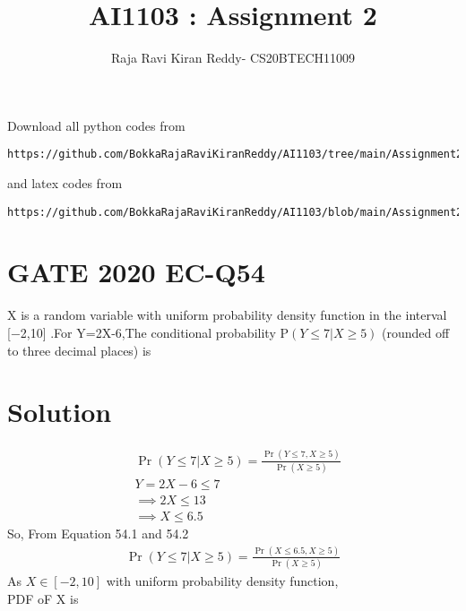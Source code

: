 \documentclass[journal,12pt,twocolumn]{IEEEtran}
\begin{document}
\let\vec\mathbf
\renewcommand{\thefigure}{\theproblem}
\def\putbox#1#2#3{\makebox[0in][l]{\makebox[#1][l]{}\raisebox{\baselineskip}[0in][0in]{\raisebox{#2}[0in][0in]{#3}}}}
     \def\rightbox#1{\makebox[0in][r]{#1}}
     \def\centbox#1{\makebox[0in]{#1}}
     \def\topbox#1{\raisebox{-\baselineskip}[0in][0in]{#1}}
     \def\midbox#1{\raisebox{-0.5\baselineskip}[0in][0in]{#1}}
\vspace{3cm}
\title{AI1103 : Assignment 2}
\author{Raja Ravi Kiran Reddy- CS20BTECH11009}
\maketitle
\newpage
\bigskip
\renewcommand{\thefigure}{\arabic{figure}}
\renewcommand{\thetable}{\arabic{table}}
Download all python codes from 
\begin{lstlisting}
https://github.com/BokkaRajaRaviKiranReddy/AI1103/tree/main/Assignment2/codes
\end{lstlisting}
%
and latex codes from 
%
\begin{lstlisting}
https://github.com/BokkaRajaRaviKiranReddy/AI1103/blob/main/Assignment2/Assignment2.tex
\end{lstlisting}
\section*{GATE 2020 EC-Q54}
X is a random variable with uniform probability density function in the interval
 [−2,10] .For Y=2X-6,The conditional probability P$(Y\leq7|X\geq5)$
(rounded off to three decimal places) is 
\section*{Solution}
\begin{align*}
\tag{54.1}
  &\Pr(Y\leq7|X\geq5)=\frac{\Pr(Y\leq7,X\geq5)}{\Pr(X\geq5)}\\
  &Y=2X-6\leq7\\
  &\implies 2X\leq13\\
  \tag{54.2}
  &\implies X\leq 6.5
\end{align*}
So,  From Equation 54.1 and 54.2
\begin{align}
   \tag{54.3}
   \Pr(Y\leq7|X\geq5)=\frac{\Pr(X\leq6.5,X\geq5)}{\Pr(X\geq5)}
\end{align}
As $X\in [-2,10]$ with uniform probability density function,\\
PDF oF X is
\end{document}
